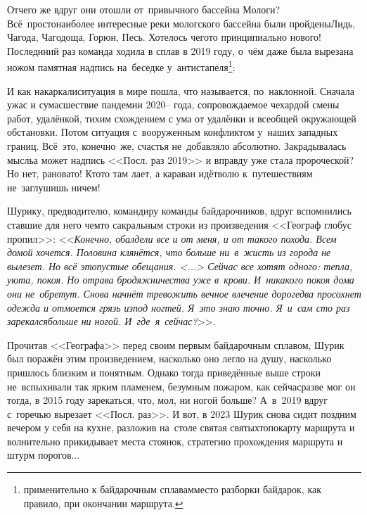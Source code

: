 {{\renewcommand*{\thefootnote}{\fnsymbol{footnote}}
\setcounter{footnote}{0}
Отчего же вдруг они отошли от~привычного бассейна Мологи\cite{СоболевВепсскаяЛетопись}? Всё~просто\mdash наиболее интересные реки мологского бассейна были пройдены\mdash Лидь, Чагода, Чагодоща, Горюн, Песь. Хотелось чего\sdash то принципиально нового! Последнний раз команда ходила в сплав в 2019 году, о~чём даже была вырезана ножом памятная надпись на~беседке у~антистапеля\footnote{применительно к байдарочным сплавам\mdash место разборки байдарок, как правило, при окончании маршрута.}: %

{\centering\LARGE{}}

\newpage
И как накаркали\mdash ситуация в мире пошла, что называется, по~наклонной. Сначала ужас и сумасшествие пандемии 2020\thinspace\nobreakdash-- года, сопровождаемое чехардой смены работ, удалёнкой, тихим схождением с ума от удалёнки и всеобщей окружающей обстановки. Потом ситуация с~вооруженным конфликтом у~наших западных границ. Всё~это, конечно~же, счастья не~добавляло абсолютно. Закрадывалась мысль\mdash а может надпись <<Посл. раз 2019>> и вправду уже стала пророческой? Но нет, рановато! Кто\sdash то там лает, а караван идёт\mdash волю к~путешествиям не~заглушишь ничем!

Шурику, предводителю, командиру команды байдарочников, вдруг вспомнились ставшие для него чем\sdash то сакральным строки из произведения <<Географ глобус пропил>>: <<\textit{Конечно, обалдели все и от меня, и от такого похода. Всем домой хочется. Половина клянётся, что больше ни~в~жисть из города не вылезет. Но всё это\mdash пустые обещания. <...> Сейчас все хотят одного: тепла, уюта, покоя. Но отрава бродяжничества уже в~крови. И~никакого покоя дома они не~обретут. Снова начнёт тревожить вечное влечение дорог\mdash едва просохнет одежда и отмоется грязь из\sdash под ногтей. Я~это знаю точно. Я~и~сам сто раз зарекался\mdash больше ни ногой. И~где~я~сейчас?}>>\cite{ГеографГлобусПропил}.

Прочитав <<Географа>> перед своим первым байдарочным сплавом, Шурик был поражён этим произведением, насколько оно легло на душу, насколько пришлось близким и понятным. Однако тогда приведённые выше строки не~вспыхивали так ярким пламенем, безумным пожаром, как сейчас\mdash разве мог он тогда, в 2015 году зарекаться, что, мол, ни ногой больше? А~в~2019 вдруг с~горечью вырезает <<Посл. раз>>. И вот, в 2023 Шурик снова сидит поздним вечером у себя на кухне, разложив на~столе святая святых\mdash топокарту маршрута и волнительно прикидывает места стоянок, стратегию прохождения маршрута и штурм порогов$\ldots$ 

}}
